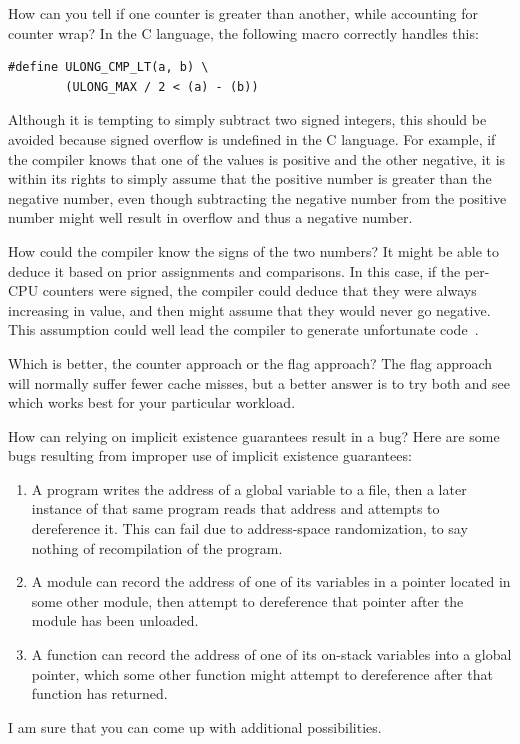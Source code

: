 \QuickQ{}
	How can you tell if one counter is greater than another,
	while accounting for counter wrap?
\QuickA{}
	In the C language, the following macro correctly handles this:

\vspace{5pt}
\begin{minipage}[t]{\columnwidth}
\small
\begin{verbatim}
#define ULONG_CMP_LT(a, b) \
        (ULONG_MAX / 2 < (a) - (b))
\end{verbatim}
\end{minipage}
\vspace{5pt}

	Although it is tempting to simply subtract two signed integers,
	this should be avoided because signed overflow is undefined
	in the C language.
	For example, if the compiler knows that one of the values is
	positive and the other negative, it is within its rights to
	simply assume that the positive number is greater than the
	negative number, even though subtracting the negative number
	from the positive number might well result in overflow and
	thus a negative number.

	How could the compiler know the signs of the two numbers?
	It might be able to deduce it based on prior assignments
	and comparisons.
	In this case, if the per-CPU counters were signed, the compiler
	could deduce that they were always increasing in value, and
	then might assume that they would never go negative.
	This assumption could well lead the compiler to generate
	unfortunate code~\cite{PaulEMcKenney2012SignedOverflow,JohnRegehr2010UndefinedBehavior}.

\QuickQ{}
	Which is better, the counter approach or the flag approach?
\QuickA{}
	The flag approach will normally suffer fewer cache misses,
	but a better answer is to try both and see which works best
	for your particular workload.

\QuickQ{}
	How can relying on implicit existence guarantees result in
	a bug?
\QuickA{}
	Here are some bugs resulting from improper use of implicit
	existence guarantees:
	\begin{enumerate}
	\item	A program writes the address of a global variable to
		a file, then a later instance of that same program
		reads that address and attempts to dereference it.
		This can fail due to address-space randomization,
		to say nothing of recompilation of the program.
	\item	A module can record the address of one of its variables
		in a pointer located in some other module, then attempt
		to dereference that pointer after the module has
		been unloaded.
	\item	A function can record the address of one of its on-stack
		variables into a global pointer, which some other
		function might attempt to dereference after that function
		has returned.
	\end{enumerate}
	I am sure that you can come up with additional possibilities.

